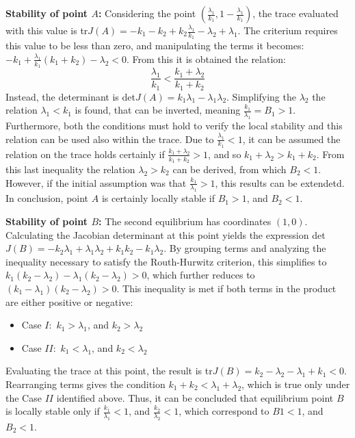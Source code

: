 \textbf{Stability of point $A$:} Considering the point $(\frac{\lambda_1}{k_1}, 1-\frac{\lambda_1}{k_1})$, the trace evaluated with this value is tr$J(A) = - k_1 - k_2 +k_2 \frac{\lambda_1}{k_1} - \lambda_2 + \lambda_1$. The criterium requires this value to be less than zero, and manipulating the terms it becomes: $-k_1 + \frac{\lambda_1}{k_1}( k_1 + k_2) - \lambda_2 < 0$. From this it is obtained the relation:
\[\frac{\lambda_1}{k_1} < \frac{k_1 + \lambda_2}{k_1 + k_2} \]
Instead, the determinant is det$J(A) = k_1 \lambda_1 - \lambda_1 \lambda_2$. Simplifying the $\lambda_2$ the relation $\lambda_1 < k_1$ is found, that can be inverted, meaning $\frac{k_1}{\lambda_1} = B_1 > 1$.
Furthermore, both the conditions must hold to verify the local stability and this relation can be used also within the trace. Due to $\frac{\lambda_1}{k_1} < 1$, it can be assumed the relation on the trace holds certainly if $\frac{k_1 + \lambda_2}{k_1 + k_2} > 1$, and so $k_1 + \lambda_2 > k_1 + k_2$. From this last inequality the relation $\lambda_2 > k_2$ can be derived, from which $B_2 < 1$. However, if the initial assumption was that $ \frac{k_1 }{\lambda_1} > 1$, this results can be extendetd.
In conclusion, point $A$ is certainly locally stable if $B_1 > 1$, and $B_2 < 1$.  
 
\textbf{Stability of point $B$:} The second equilibrium has coordinates $(1,0)$. Calculating the Jacobian determinant at this point yields the expression det$J(B)= - k_2 \lambda_1 + \lambda_1 \lambda_2 + k_1 k_2 - k_1 \lambda_2$. By grouping terms and analyzing the inequality necessary to satisfy the Routh-Hurwitz criterion, this simplifies to $k_1 (k_2 - \lambda_2) - \lambda_1(k_2 - \lambda_2) > 0$, which further reduces to $(k_1 - \lambda_1) (k_2 - \lambda_2) >0$.
This inequality is met if both terms in the product are either positive or negative:
\begin{itemize}
	\item Case $I:$ $k_1 > \lambda_1$, and $k_2 > \lambda_2$
	\item Case $II:$ $k_1 < \lambda_1$, and $k_2 < \lambda_2$
\end{itemize}
Evaluating the trace at this point, the result is tr$J(B) = k_2 - \lambda_2 - \lambda_1 + k_1 < 0 $. Rearranging terms gives the condition $k_1 + k_2 < \lambda_1 + \lambda_2$, which is true only under the Case $II$ identified above. 
Thus, it can be concluded that equilibrium point $B$ is locally stable only if $\frac{k_1}{\lambda_1} <1$, and  $\frac{k_2}{\lambda_2} <1$, which correspond to $B1 < 1$, and $B_2 <1$.

